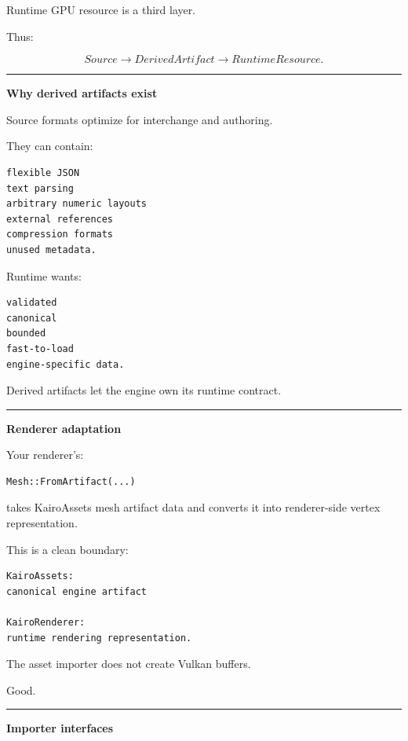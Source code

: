 Runtime GPU resource is a third layer.

Thus:

\[
\boxed{
Source
\rightarrow
DerivedArtifact
\rightarrow
RuntimeResource.
}
\]

\begin{center}\rule{0.5\linewidth}{0.5pt}\end{center}

\textbf{Why derived artifacts exist}

Source formats optimize for interchange and authoring.

They can contain:

\begin{verbatim}
flexible JSON
text parsing
arbitrary numeric layouts
external references
compression formats
unused metadata.
\end{verbatim}

Runtime wants:

\begin{verbatim}
validated
canonical
bounded
fast-to-load
engine-specific data.
\end{verbatim}

Derived artifacts let the engine own its runtime contract.

\begin{center}\rule{0.5\linewidth}{0.5pt}\end{center}

\textbf{Renderer adaptation}

Your renderer's:

\begin{verbatim}
Mesh::FromArtifact(...)
\end{verbatim}

takes KairoAssets mesh artifact data and converts it into renderer-side vertex representation.

This is a clean boundary:

\begin{verbatim}
KairoAssets:
canonical engine artifact

KairoRenderer:
runtime rendering representation.
\end{verbatim}

The asset importer does not create Vulkan buffers.

Good.

\begin{center}\rule{0.5\linewidth}{0.5pt}\end{center}

\textbf{Importer interfaces}

